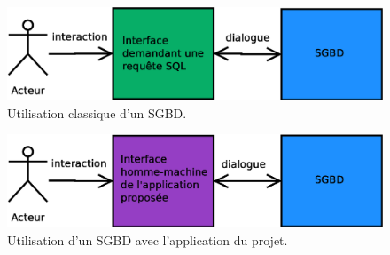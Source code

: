 \begin{figure}[!h]
  \centering
  \includegraphics[width=14cm]{images/sans_idb.eps}
  \caption{Utilisation classique d'un SGBD.}
  \label{sans_idb_schema}
\end{figure}

\begin{figure}[!h]
  \centering
  \includegraphics[width=14cm]{images/avec_idb.eps}
  \caption{Utilisation d'un SGBD avec l'application du projet.}
  \label{avec_idb_schema}
\end{figure}

